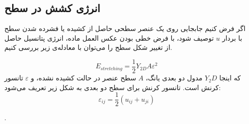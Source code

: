 \setRL


\subsection{
انرژی کشش در سطح
}
اگر فرض کنیم جابجایی روی یک عنصر سطحی حاصل از کشیده‌ یا فشرده شدن سطح با بردار 
$u$
توصیف شود، با فرض خطی بودن عکس العمل ماده، انرژی پتانسیل حاصل از تغییر شکل سطح را می‌توان با معادله‌ی زیر بررسی کنیم.

\begin{equation}
E_{stretching}=\frac{1}{2}Y_{2D}A\varepsilon^2
\end{equation}
که اینجا 
$Y_2D$
مدول دو بعدی یانگ،
$A$
سطح عنصر در حالت کشیده نشده، و
$\varepsilon$
تانسور کرنش است. تانسور کرنش برای سطح دو بعدی به شکل زیر تعریف می‌شود:
\begin{equation}
\varepsilon_{ij} = \frac{1}{2}(u_{ij}+u_{ji})
\end{equation}


.
 
 
 
 
 
 
 
 
 
 
 
 
 
 
 
